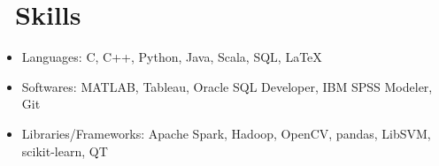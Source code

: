 \documentclass{resume}
\begin{document}
\section{\faCogs\ Skills}
\begin{itemize}[parsep=0.5ex]
  \item Languages: C, C++, Python, Java, Scala, SQL, \LaTeX
  \item Softwares: MATLAB, Tableau, Oracle SQL Developer, IBM SPSS Modeler, Git
  \item Libraries/Frameworks: Apache Spark, Hadoop, OpenCV, pandas, LibSVM, scikit-learn, QT
\end{itemize}

%
\end{document}
